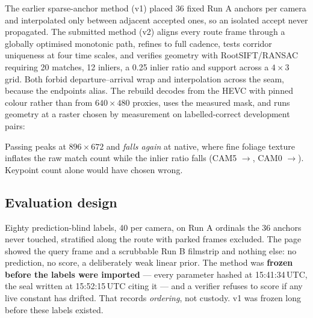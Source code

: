 \documentclass[10pt,a4paper]{article}
\begin{document}
\vspace{1pt}
\begin{center}
\end{center}

The earlier sparse-anchor method (v1) placed 36 fixed Run A anchors per camera
and interpolated only between adjacent accepted ones, so an isolated accept never
propagated. The submitted method (v2) aligns every route frame through a globally
optimised monotonic path, refines to full cadence, tests corridor uniqueness at
four time scales, and verifies geometry with RootSIFT/RANSAC requiring 20
matches, 12 inliers, a 0.25 inlier ratio and support across a $4\times3$ grid.
Both forbid departure--arrival wrap and interpolation across the seam, because
the endpoints alias. The rebuild decodes from the HEVC with pinned colour rather
than from $640\times480$ proxies, uses the measured mask, and runs geometry at a
raster chosen by measurement on labelled-correct development pairs:

\vspace{-2pt}

\vspace{-1pt}

{\small Passing peaks at $896\times672$ and \emph{falls again} at native, where
fine foliage texture inflates the raw match count while the inlier ratio falls
(CAM5 \InlierSelectedCamFive{}$\to$\InlierNativeCamFive{}, CAM0
\InlierSelectedCamZero{}$\to$\InlierNativeCamZero{}). Keypoint count alone would
have chosen wrong.}

\subsection{Evaluation design}

Eighty prediction-blind labels, 40 per camera, on Run A ordinals the 36 anchors
never touched, stratified along the route with parked frames excluded. The page
showed the query frame and a scrubbable Run B filmstrip and nothing else: no
prediction, no score, a deliberately weak linear prior. The method was
\textbf{frozen before the labels were imported} --- every parameter hashed at
15:41:34\,UTC, the seal written at 15:52:15\,UTC citing it --- and a verifier
refuses to score if any live constant has drifted. That records
\emph{ordering}, not custody. v1 was frozen long before these labels existed.
\end{document}
